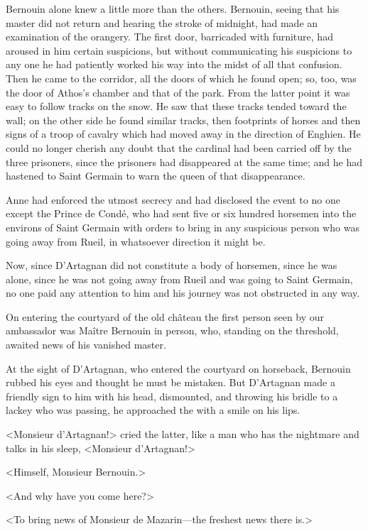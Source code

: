 Bernouin alone knew a little more than the others. Bernouin, seeing that his master did not return and hearing the stroke of midnight, had made an examination of the orangery. The first door, barricaded with furniture, had aroused in him certain suspicions, but without communicating his suspicions to any one he had patiently worked his way into the midst of all that confusion. Then he came to the corridor, all the doors of which he found open; so, too, was the door of Athos's chamber and that of the park. From the latter point it was easy to follow tracks on the snow. He saw that these tracks tended toward the wall; on the other side he found similar tracks, then footprints of horses and then signs of a troop of cavalry which had moved away in the direction of Enghien. He could no longer cherish any doubt that the cardinal had been carried off by the three prisoners, since the prisoners had disappeared at the same time; and he had hastened to Saint Germain to warn the queen of that disappearance.

Anne had enforced the utmost secrecy and had disclosed the event to no one except the Prince de Condé, who had sent five or six hundred horsemen into the environs of Saint Germain with orders to bring in any suspicious person who was going away from Rueil, in whatsoever direction it might be.

Now, since D'Artagnan did not constitute a body of horsemen, since he was alone, since he was not going away from Rueil and was going to Saint Germain, no one paid any attention to him and his journey was not obstructed in any way.

On entering the courtyard of the old château the first person seen by our ambassador was Maître Bernouin in person, who, standing on the threshold, awaited news of his vanished master.

At the sight of D'Artagnan, who entered the courtyard on horseback, Bernouin rubbed his eyes and thought he must be mistaken. But D'Artagnan made a friendly sign to him with his head, dismounted, and throwing his bridle to a lackey who was passing, he approached the  with a smile on his lips.

<Monsieur d'Artagnan!> cried the latter, like a man who has the nightmare and talks in his sleep, <Monsieur d'Artagnan!>

<Himself, Monsieur Bernouin.>

<And why have you come here?>

<To bring news of Monsieur de Mazarin—the freshest news there is.>

